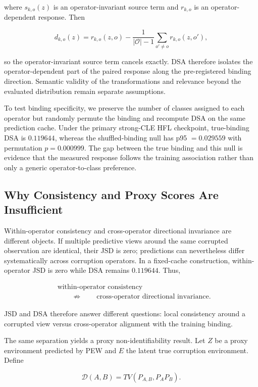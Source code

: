 where \(s_{k,o}(z)\) is an operator-invariant source term and \(r_{k,o}\) is an operator-dependent response. Then

\[
d_{k,o}(z)=r_{k,o}(z,o)
-\frac{1}{|\mathcal O|-1}\sum_{o'\neq o}r_{k,o}(z,o'),
\]

so the operator-invariant source term cancels exactly. DSA therefore isolates the operator-dependent part of the paired response along the pre-registered binding direction. Semantic validity of the transformations and relevance beyond the evaluated distribution remain separate assumptions.

To test binding specificity, we preserve the number of classes assigned to each operator but randomly permute the binding and recompute DSA on the same prediction cache. Under the primary strong-CLE HFL checkpoint, true-binding DSA is \(0.119644\), whereas the shuffled-binding null has p95 \(=0.029559\) with permutation \(p=0.000999\). The gap between the true binding and this null is evidence that the measured response follows the training association rather than only a generic operator-to-class preference.

\subsection{Why Consistency and Proxy Scores Are Insufficient}

Within-operator consistency and cross-operator directional invariance are different objects. If multiple predictive views around the same corrupted observation are identical, their JSD is zero; predictions can nevertheless differ systematically across corruption operators. In a fixed-cache construction, within-operator JSD is zero while DSA remains \(0.119644\). Thus,

\[
\begin{aligned}
&\text{within-operator consistency}\\
&\qquad\not\Rightarrow\qquad
\text{cross-operator directional invariance}.
\end{aligned}
\]

JSD and DSA therefore answer different questions: local consistency around a corrupted view versus cross-operator alignment with the training binding.

The same separation yields a proxy non-identifiability result. Let \(Z\) be a proxy environment predicted by PEW and \(E\) the latent true corruption environment. Define

\[
\mathcal D(A,B)=TV(P_{A,B},P_AP_B).
\]

